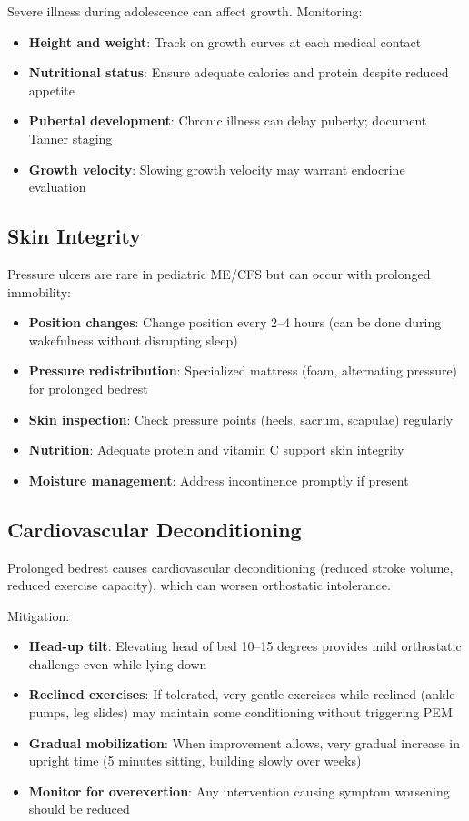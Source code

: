 Severe illness during adolescence can affect growth. Monitoring:

\begin{itemize}
    \item \textbf{Height and weight}: Track on growth curves at each medical contact
    \item \textbf{Nutritional status}: Ensure adequate calories and protein despite reduced appetite
    \item \textbf{Pubertal development}: Chronic illness can delay puberty; document Tanner staging
    \item \textbf{Growth velocity}: Slowing growth velocity may warrant endocrine evaluation
\end{itemize}

\subsection{Skin Integrity}

Pressure ulcers are rare in pediatric ME/CFS but can occur with prolonged immobility:

\begin{itemize}
    \item \textbf{Position changes}: Change position every 2--4 hours (can be done during wakefulness without disrupting sleep)
    \item \textbf{Pressure redistribution}: Specialized mattress (foam, alternating pressure) for prolonged bedrest
    \item \textbf{Skin inspection}: Check pressure points (heels, sacrum, scapulae) regularly
    \item \textbf{Nutrition}: Adequate protein and vitamin C support skin integrity
    \item \textbf{Moisture management}: Address incontinence promptly if present
\end{itemize}

\subsection{Cardiovascular Deconditioning}

Prolonged bedrest causes cardiovascular deconditioning (reduced stroke volume, reduced exercise capacity), which can worsen orthostatic intolerance.

Mitigation:
\begin{itemize}
    \item \textbf{Head-up tilt}: Elevating head of bed 10--15 degrees provides mild orthostatic challenge even while lying down
    \item \textbf{Reclined exercises}: If tolerated, very gentle exercises while reclined (ankle pumps, leg slides) may maintain some conditioning without triggering PEM
    \item \textbf{Gradual mobilization}: When improvement allows, very gradual increase in upright time (5 minutes sitting, building slowly over weeks)
    \item \textbf{Monitor for overexertion}: Any intervention causing symptom worsening should be reduced
\end{itemize}


